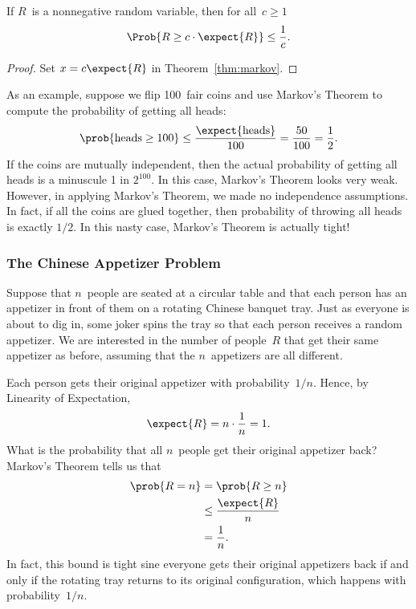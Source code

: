 \begin{corollary}
If $R$~is a nonnegative random variable, then for all~$c \geq 1$
\begin{equation}
\Prob{\strut R \geq c \cdot \expect{R}}
    \leq \frac{1}{c}.\label{markovaboveemean}
\end{equation}
\end{corollary}

\begin{proof}
    Set $x = c \expect{R}$ in Theorem~\ref{thm:markov}.
\end{proof}

As an example, suppose we flip 100~fair coins and use Markov's Theorem
to compute the probability of getting all heads:
\[
\prob{\text{heads} \geq 100} \leq \frac{\expect{\text{heads}}}{100} =
\frac{50}{100} = \frac{1}{2}.
\]
If the coins are mutually independent, then the actual probability of
getting all heads is a minuscule 1 in $2^{100}$.  In this case, Markov's
Theorem looks very weak.  However, in applying Markov's Theorem, we made
no independence assumptions.  In fact, if all the coins are glued
together, then probability of throwing all heads is exactly $1/2$.
In this nasty case, Markov's Theorem is actually tight!

\subsubsection{The Chinese Appetizer Problem}

Suppose that $n$~people are seated at a circular table and that each
person has an appetizer in front of them on a rotating Chinese banquet
tray.  Just as everyone is about to dig in, some joker spins the tray
so that each person receives a random appetizer.  We are interested in
the number of people~$R$ that get their same appetizer as before,
assuming that the $n$~appetizers are all different.

Each person gets their original appetizer with probability~$1/n$.
Hence, by Linearity of Expectation,
\begin{equation*}
    \expect{R} = n \cdot \frac{1}{n} = 1.
\end{equation*}
What is the probability that all $n$~people get their original
appetizer back?  Markov's Theorem tells us that
\begin{align*}
\prob{R = n}
    &= \prob{R \ge n} \\
    &\le \frac{\expect{R}}{n} \\
    &= \frac{1}{n}.
\end{align*}
In fact, this bound is tight sine everyone gets their original
appetizers back if and only if the rotating tray returns to its
original configuration, which happens with probability~$1/n$.

